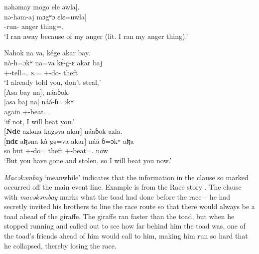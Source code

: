 \medskip
nəhəmay  mogo  ele  əwla].\\
\gll nə-həm-aj mɔgʷɔ ɛlɛ=uwla]\\
     {\oneS}-run-{\CL}  anger thing={\oneS}.{\POSS}\\
\glt  ‘I ran away because of my anger (lit. I ran my anger thing).’ 
\z 

\clearpage
\ea \label{ex:12:60}	
Nahok  na  va,  kége  akar  bay.\\   
\gll  nà-h=ɔkʷ na=va k\'{ɛ}-g-ɛ akar baj  \\    
      {\oneS}+{\PFV}-tell={\twoS}.{\IO}    \textsc{s}.{\DO}={\PRF}  {\twoS}+{\IFV}-do-{\CL}  theft  {\NEG}\\     
\glt ‘I already told you, don’t steal,’\\

\medskip
{}[Asa  bay  na],  náaɓok.\\
\gll {}[asa baj na]  náá-ɓ=ɔkʷ \\ 
     again {\NEG}  {\PSP}  {}{\oneS}+{\POT}{}-beat={\twoS}.{\IO}\\ 
\glt ‘if not, I will beat you.’\\

\medskip
{}[\textbf{Nde} azləna  kagəva  akar]  náaɓok  azla.\\
\gll {}[\textbf{ndɛ} aɮəna kà-gə=va akar] náá-ɓ=ɔkʷ  aɮa\\
     so  but {\twoS}+{\PFV}-do={\PRF}  theft  {\oneS}+{\POT}-beat={\twoS}.{\IO}  now\\
\glt  ‘But you have gone and stolen, so I will beat you now.’  
\z 

\largerpage
\textit{Macəkəmbay } ‘meanwhile’ indicates that the information in the clause so marked occurred off the main event line. Example  is from the Race story \citep{Friesen2003}. The clause with \textit{macəkəmbay} marks what the toad had done before the race -- he had secretly invited his brothers to line the race route so that there would always be a toad ahead of the giraffe. The giraffe ran faster than the toad, but when he stopped running and called out to see how far behind him the toad was, one of the toad’s friends ahead of him would call to him, making him run so hard that he collapsed, thereby losing the race. 

